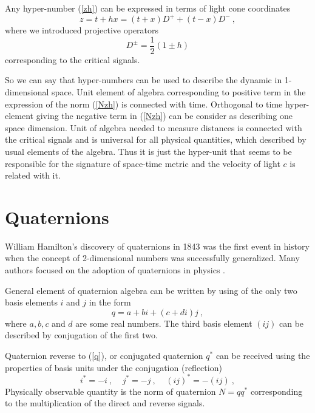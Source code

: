 \documentclass[a4paper,12pt]{article}
\begin{document}
Any hyper-number (\ref{zh}) can be expressed in terms of light cone coordinates
\begin{equation} \label{zhDec}
z = t +hx = (t + x)D^+ + (t - x)D^- ~,
\end{equation}
where we introduced projective operators
\begin{equation} \label{Dzh}
D^\pm = \frac{1}{2}(1 \pm h) 
\end{equation}
corresponding to the critical signals.

So we can say that hyper-numbers can be used to describe the dynamic in 1-dimensional 
space. Unit element of algebra corresponding to positive term in the expression of the 
norm (\ref{Nzh}) is connected with time. Orthogonal to time hyper-element giving the 
negative term in (\ref{Nzh}) can be consider as describing one space dimension. Unit 
of algebra needed to measure distances is connected with the critical signals and is 
universal for all physical quantities, which described by usual elements of the algebra. 
Thus it is just the hyper-unit that seems to be responsible for the signature of 
space-time metric and the velocity of light $c$ is related with it.


\section{Quaternions}

William Hamilton's discovery of quaternions in 1843 was the first event in history when 
the concept of 2-dimensional numbers was successfully generalized. Many authors focused 
on the adoption of quaternions in physics \cite{Sa,Qua}. 

General element of quaternion algebra can be written by using of the only two basis 
elements $i$ and $j$ in the form
\begin{equation} \label{q}
q = a + bi + (c + di)j ~,
\end{equation}
where $a, b, c$ and $d$ are some real numbers. The third basis element $(ij)$ can be 
described by conjugation of the first two.

Quaternion reverse to (\ref{q}), or conjugated quaternion $q^*$ can be received using 
the properties of basis units under the conjugation (reflection)
\begin{equation} \label{*}
i^* = - i~, ~~~~~j^* = - j~, ~~~~~ (ij)^* = - (ij) ~,
\end{equation}
Physically observable quantity is the norm of quaternion $N = qq^*$ corresponding to 
the multiplication of the direct and reverse signals.
\end{document}
